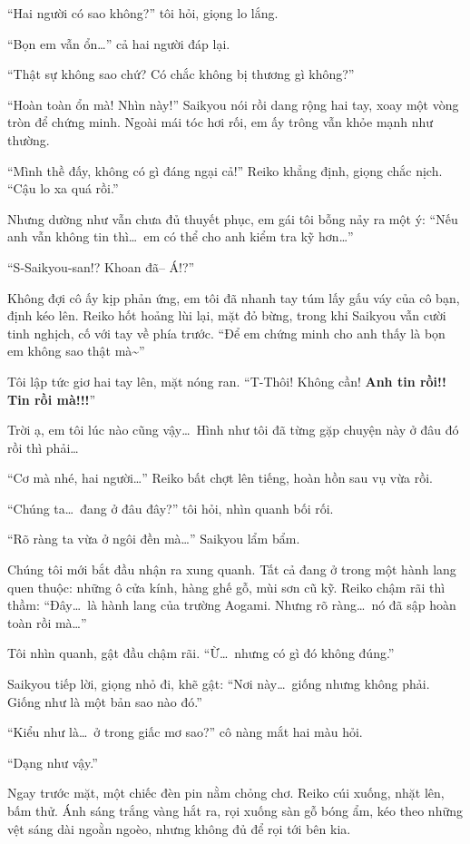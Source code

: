 \documentclass[../main.tex]{subfiles}
\begin{document}
``Hai người có sao không?'' tôi hỏi, giọng lo lắng.

``Bọn em vẫn ổn\dots'' cả hai người đáp lại.

``Thật sự không sao chứ? Có chắc không bị thương gì không?''

``Hoàn toàn ổn mà! Nhìn này!'' Saikyou nói rồi dang rộng hai tay, xoay một vòng tròn để chứng minh. Ngoài mái tóc hơi rối, em ấy trông vẫn khỏe mạnh như thường.

``Mình thề đấy, không có gì đáng ngại cả!'' Reiko khẳng định, giọng chắc nịch. ``Cậu lo xa quá rồi.''

Nhưng dường như vẫn chưa đủ thuyết phục, em gái tôi bỗng nảy ra một ý: ``Nếu anh vẫn không tin thì\dots\ em có thể cho anh kiểm tra kỹ hơn\dots''

``S-Saikyou-san!? Khoan đã-- Á!?''

Không đợi cô ấy kịp phản ứng, em tôi đã nhanh tay túm lấy gấu váy của cô bạn, định kéo lên. Reiko hốt hoảng lùi lại, mặt đỏ bừng, trong khi Saikyou vẫn cười tinh nghịch, cố với tay về phía trước. ``Để em chứng minh cho anh thấy là bọn em không sao thật mà\~{}''

Tôi lập tức giơ hai tay lên, mặt nóng ran. ``T-Thôi! Không cần! \textbf{Anh tin rồi!! Tin rồi mà!!!}''

Trời ạ, em tôi lúc nào cũng vậy\dots\ Hình như tôi đã từng gặp chuyện này ở đâu đó rồi thì phải\dots

``Cơ mà nhé, hai người\dots'' Reiko bất chợt lên tiếng, hoàn hồn sau vụ vừa rồi.

``Chúng ta\dots\ đang ở đâu đây?'' tôi hỏi, nhìn quanh bối rối.

``Rõ ràng ta vừa ở ngôi đền mà\dots'' Saikyou lẩm bẩm.

Chúng tôi mới bắt đầu nhận ra xung quanh. Tất cả đang ở trong một hành lang quen thuộc: những ô cửa kính, hàng ghế gỗ, mùi sơn cũ kỹ. Reiko chậm rãi thì thầm: ``Đây\dots\ là hành lang của trường Aogami. Nhưng rõ ràng\dots\ nó đã sập hoàn toàn rồi mà\dots''

Tôi nhìn quanh, gật đầu chậm rãi. ``Ừ\dots\ nhưng có gì đó không đúng.''

Saikyou tiếp lời, giọng nhỏ đi, khẽ gật: ``Nơi này\dots\ giống nhưng không phải. Giống như là một bản sao nào đó.''

``Kiểu như là\dots\ ở trong giấc mơ sao?'' cô nàng mắt hai màu hỏi.

``Dạng như vậy.''

Ngay trước mặt, một chiếc đèn pin nằm chỏng chơ. Reiko cúi xuống, nhặt lên, bấm thử. Ánh sáng trắng vàng hắt ra, rọi xuống sàn gỗ bóng ẩm, kéo theo những vệt sáng dài ngoằn ngoèo, nhưng không đủ để rọi tới bên kia.
\end{document}
